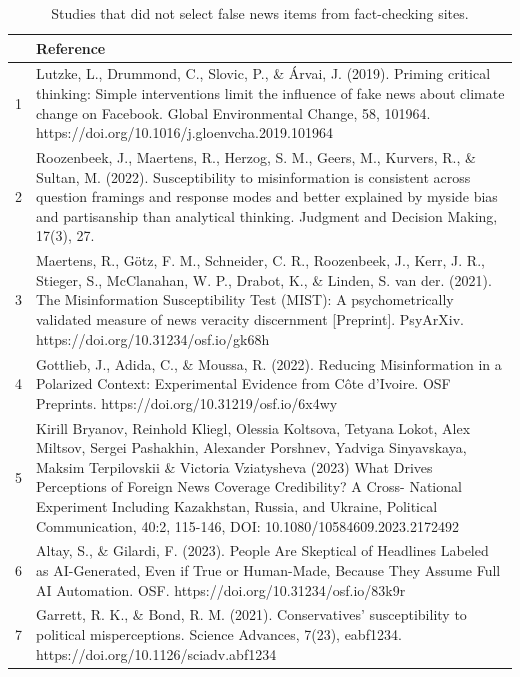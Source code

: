 \documentclass[
  doc,floatsintext]{apa6}
\begin{document}
\begin{table}[tbp]

\begin{center}
\begin{threeparttable}

\caption{\label{tab:non-fact-check-sites-studies}Studies that did not select false news items from fact-checking sites.}

\scriptsize{

\begin{tabular}{lm{16cm}}
\toprule
 & Reference\\
\midrule
1 & Lutzke, L., Drummond, C., Slovic, P., \& Árvai, J. (2019). Priming critical thinking: Simple interventions limit the influence of fake news about climate change on Facebook. Global Environmental Change, 58, 101964. https://doi.org/10.1016/j.gloenvcha.2019.101964\\
2 & Roozenbeek, J., Maertens, R., Herzog, S. M., Geers, M., Kurvers, R., \& Sultan, M. (2022). Susceptibility to misinformation is consistent across question framings and response modes and better explained by myside bias and partisanship than analytical thinking. Judgment and Decision Making, 17(3), 27.\\
3 & Maertens, R., Götz, F. M., Schneider, C. R., Roozenbeek, J., Kerr, J. R., Stieger, S., McClanahan, W. P., Drabot, K., \& Linden, S. van der. (2021). The Misinformation Susceptibility Test (MIST): A psychometrically validated measure of news veracity discernment [Preprint]. PsyArXiv. https://doi.org/10.31234/osf.io/gk68h\\
4 & Gottlieb, J., Adida, C., \& Moussa, R. (2022). Reducing Misinformation in a Polarized Context: Experimental Evidence from Côte d’Ivoire. OSF Preprints. https://doi.org/10.31219/osf.io/6x4wy\\
5 & Kirill Bryanov, Reinhold Kliegl, Olessia Koltsova, Tetyana Lokot, Alex Miltsov, Sergei Pashakhin, Alexander Porshnev, Yadviga Sinyavskaya, Maksim Terpilovskii \& Victoria Vziatysheva (2023) What Drives Perceptions of Foreign News Coverage Credibility? A Cross- National Experiment Including Kazakhstan, Russia, and Ukraine, Political Communication, 40:2, 115-146, DOI: 10.1080/10584609.2023.2172492\\
6 & Altay, S., \& Gilardi, F. (2023). People Are Skeptical of Headlines Labeled as AI-Generated, Even if True or Human-Made, Because They Assume Full AI Automation. OSF. https://doi.org/10.31234/osf.io/83k9r\\
7 & Garrett, R. K., \& Bond, R. M. (2021). Conservatives’ susceptibility to political misperceptions. Science Advances, 7(23), eabf1234. https://doi.org/10.1126/sciadv.abf1234\\

\end{tabular}}
\end{threeparttable}
\end{center}
\end{table}
\end{document}
